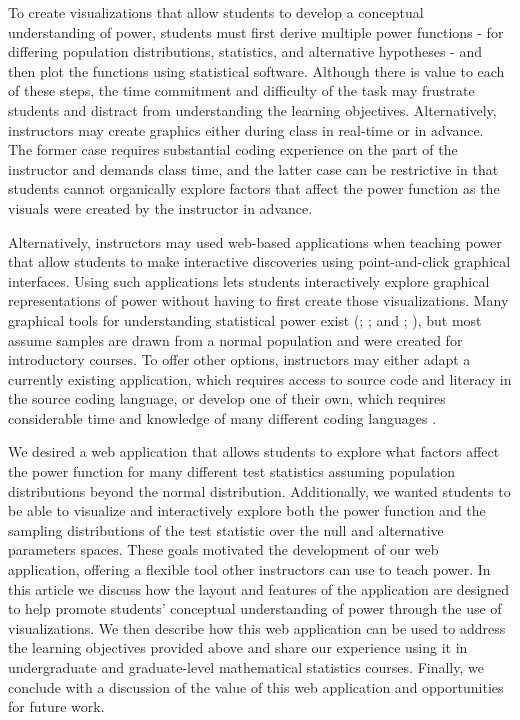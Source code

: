 \documentclass{TISE}
\begin{document}
To create visualizations that allow students to develop a conceptual understanding of power, students must first derive multiple power functions - for differing population distributions, statistics, and alternative hypotheses - and then plot the functions using statistical software. Although there is value to each of these steps, the time commitment and difficulty of the task may frustrate students and distract from understanding the learning objectives. Alternatively, instructors may create graphics either during class in real-time or in advance. The former case requires substantial coding experience on the part of the instructor and demands class time, and the latter case can be restrictive in that students cannot organically explore factors that affect the power function as the visuals were created by the instructor in advance.

Alternatively, instructors may used web-based applications when teaching power that allow students to make interactive discoveries using point-and-click graphical interfaces. Using such applications lets students interactively explore graphical representations of power without having to first create those visualizations. Many graphical tools for understanding statistical power exist (\citealt{aberson2002}; \citealt{andersoncook2003}; and \citealt{rossman2004}; \citealt{post2016}), but most assume samples are drawn from a normal population and were created for introductory courses. To offer other options, instructors may either adapt a currently existing application, which requires access to source code and literacy in the source coding language, or develop one of their own, which requires considerable time and knowledge of many different coding languages \citep{doi2016}.  

We desired a web application that allows students to explore what factors affect the power function for many different test statistics assuming population distributions beyond the normal distribution. Additionally, we wanted students to be able to visualize and interactively explore both the power function and the sampling distributions of the test statistic over the null and alternative parameters spaces. These goals motivated the development of our web application, offering a flexible tool other instructors can use to teach power. In this article we discuss how the layout and features of the application are designed to help promote students' conceptual understanding of power through the use of visualizations. We then describe how this web application can be used to address the learning objectives provided above and share our experience using it in undergraduate and graduate-level mathematical statistics courses. Finally, we conclude with a discussion of the value of this web application and opportunities for future work. 
\end{document}
